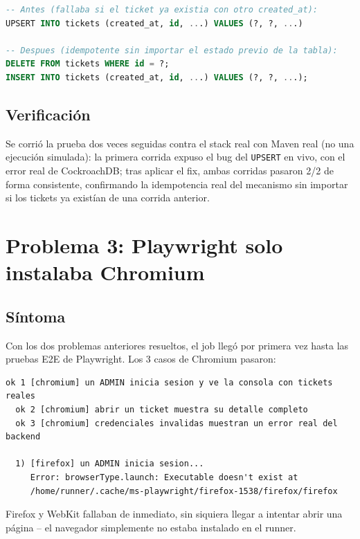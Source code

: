 \documentclass[11pt,letterpaper]{article}
\begin{document}
\begin{lstlisting}[language=SQL,caption={Reemplazo de UPSERT por DELETE + INSERT}]
-- Antes (fallaba si el ticket ya existia con otro created_at):
UPSERT INTO tickets (created_at, id, ...) VALUES (?, ?, ...)

-- Despues (idempotente sin importar el estado previo de la tabla):
DELETE FROM tickets WHERE id = ?;
INSERT INTO tickets (created_at, id, ...) VALUES (?, ?, ...);
\end{lstlisting}

\subsection{Verificación}
Se corrió la prueba dos veces seguidas contra el stack real con Maven real (no una ejecución
simulada): la primera corrida expuso el bug del \texttt{UPSERT} en vivo, con el error real de
CockroachDB; tras aplicar el fix, ambas corridas pasaron 2/2 de forma consistente, confirmando
la idempotencia real del mecanismo sin importar si los tickets ya existían de una corrida
anterior.

\section{Problema 3: Playwright solo instalaba Chromium}

\subsection{Síntoma}
Con los dos problemas anteriores resueltos, el job llegó por primera vez hasta las pruebas E2E de
Playwright. Los 3 casos de Chromium pasaron:

\begin{lstlisting}[caption={Chromium paso, Firefox y WebKit fallaron de inmediato}]
  ok 1 [chromium] un ADMIN inicia sesion y ve la consola con tickets reales
  ok 2 [chromium] abrir un ticket muestra su detalle completo
  ok 3 [chromium] credenciales invalidas muestran un error real del backend

  1) [firefox] un ADMIN inicia sesion...
     Error: browserType.launch: Executable doesn't exist at
     /home/runner/.cache/ms-playwright/firefox-1538/firefox/firefox
\end{lstlisting}

Firefox y WebKit fallaban de inmediato, sin siquiera llegar a intentar abrir una página --
el navegador simplemente no estaba instalado en el runner.
\end{document}
